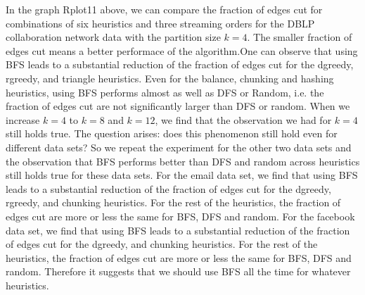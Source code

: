 \documentclass[12pt]{article}
\begin{document}
\newpage
\FloatBarrier
\begin{figure}
\end{figure}
\FloatBarrier
In the graph Rplot11 above, we can compare the fraction of edges cut for combinations of six heuristics and three streaming orders for the DBLP collaboration network data with the partition size $k=4$. The smaller fraction of edges cut means a better performace of the algorithm.One can observe that using BFS leads to a substantial reduction of the fraction of edges cut for the dgreedy, rgreedy, and triangle heuristics. Even for the balance, chunking and hashing heuristics, using BFS performs almost as well as DFS or Random, i.e. the fraction of edges cut are not significantly larger than DFS or random. When we increase $k=4$ to $k=8$ and $k=12$, we find that the observation we had for $k=4$ still holds true. The question arises: does this phenomenon still hold even for different data sets? So we repeat the experiment for the other two data sets and the observation that BFS performs better than DFS and random across heuristics still holds true for these data sets. For the email data set, we find that using BFS leads to a substantial reduction of the fraction of edges cut for the dgreedy, rgreedy, and chunking heuristics. For the rest of the heuristics, the fraction of edges cut are more or less the same for BFS, DFS and random. For the facebook data set, we find that using BFS leads to a substantial reduction of the fraction of edges cut for the dgreedy, and chunking heuristics. For the rest of the heuristics, the fraction of edges cut are more or less the same for BFS, DFS and random. Therefore it suggests that we should use BFS all the time for whatever heuristics.  \\
\end{document}
